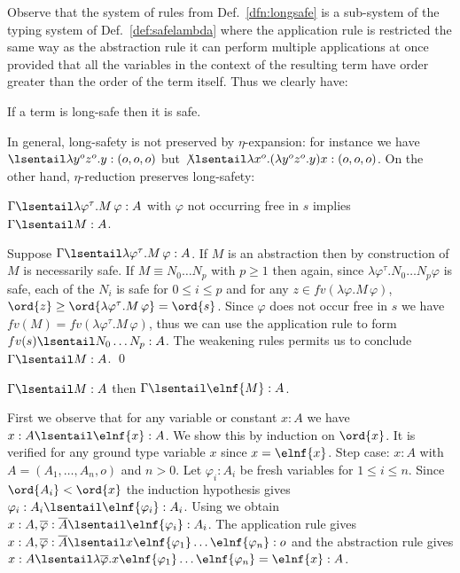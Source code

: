 Observe that the system of rules from Def.~\ref{dfn:longsafe} is a sub-system of the typing system of Def.~\ref{def:safelambda} where the application rule is  restricted the same way as the abstraction rule \ie it can perform multiple applications at once provided that all the variables in the context of the resulting term have order greater than the order of the term itself. Thus we clearly have:
\begin{lemma}
\label{lem:longsafe_imp_safe}
If a term is long-safe then it is safe.
\end{lemma}
\smallskip

In general, long-safety is not preserved by $\eta$-expansion: for
instance we have
$\lsentail \lambda y^o z^o . y : (o,o,o)$ but
$\not \lsentail\lambda x^o . (\lambda y^o z^o . y) x : (o,o,o)$.
On the other hand,  $\eta$-reduction preserves long-safety:

\begin{lemma}
\label{lem:etared_preserve_longsafety}
  $\Gamma \lsentail \lambda \varphi^\tau . M\, \varphi :A $ with $\varphi$ not
  occurring free in $s$ implies $\Gamma \lsentail M :A$.
\end{lemma}
\proof
  Suppose $\Gamma \lsentail \lambda \varphi^\tau . M\, \varphi :A$. If $M$ is an  abstraction then by construction of $M$ is necessarily safe.  If $M \equiv N_0 \ldots N_p$ with
  $p\geq 1$ then again, since $\lambda \varphi^\tau . N_0 \ldots N_p
  \varphi$ is safe, each of the $N_i$ is safe for $0 \leq i \leq p$
  and for any $z\in fv(\lambda \varphi . M\, \varphi)$, $\ord{z} \geq
  \ord{\lambda \varphi^\tau . M\, \varphi} = \ord{s}$. Since  $\varphi$ does not occur free in $s$ we have $fv(M) = fv(\lambda \varphi^\tau . M\, \varphi)$, thus we can use the application rule to form $fv(s) \lsentail N_0 \ldots N_p : A$. The weakening rules permits us to conclude $\Gamma \lsentail M :A$. \qed
\smallskip

\begin{lemma}
\label{lem:longsafe_imp_elnf_longsafe}
$\Gamma \lsentail M :A$ then $\Gamma \lsentail \elnf{M} :A$.
\end{lemma}
\proof
 First we observe that for any variable or constant $x:A$ we have $x:A \lsentail \elnf{x} :A$. We show this by induction on $\ord{x}$.
It is verified for any ground type variable $x$
since $x = \elnf{x}$.
Step case: $x:A$ with $A=(A_1, \ldots, A_n,o)$ and $n>0$. Let $\varphi_i:A_i$ be fresh variables for $1\leq i\leq n$.
Since $\ord{A_i} < \ord{x}$ the induction hypothesis gives $\varphi_i :A_i \lsentail \elnf{\varphi_i} : A_i$. Using  we obtain $x:A, \overline{\varphi} : \overline{A}
  \lsentail \elnf{\varphi_i} :A_i$.  The application rule gives $x :A, \overline{\varphi} : \overline{A} \lsentail x \elnf{\varphi_1} \ldots \elnf{\varphi_n}
  : o$ and the abstraction rule gives $ x :A \lsentail \lambda
  \overline{\varphi} . x \elnf{\varphi_1} \ldots \elnf{\varphi_n} =
  \elnf{x} :A$.


